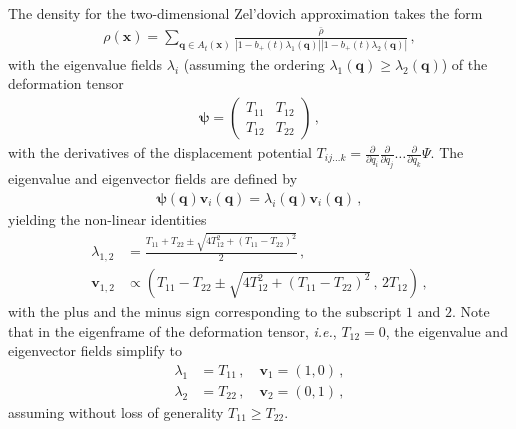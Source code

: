 \documentclass[a4paper, 11pt]{article}
\begin{document}
The density for the two-dimensional Zel'dovich approximation takes the form
\begin{align}
\rho(\bm{x}) = \sum_{\bm{q} \in A_t(\bm{x})}\frac{\bar{\rho}}{|1-b_+(t)\lambda_1(\bm{q})||1-b_+(t)\lambda_2(\bm{q})|}\,,
\end{align}
with the eigenvalue fields $\lambda_i$ (assuming the ordering $\lambda_1(\bm{q}) \geq \lambda_2(\bm{q})$) of the deformation tensor
\begin{align}
\bm{\psi} =
\begin{pmatrix}
T_{11} & T_{12}\\
T_{12} & T_{22}
\end{pmatrix}\,,
\end{align}
with the derivatives of the displacement potential $T_{i j \dots k} = \frac{\partial}{\partial q_i}\frac{\partial}{\partial q_j}\dots \frac{\partial}{\partial q_k} \Psi$. The eigenvalue and eigenvector fields are defined by
\begin{align}
\bm{\psi}(\bm{q}) \bm{v}_i(\bm{q}) =\lambda_i(\bm{q}) \bm{v}_i(\bm{q})\,,
\end{align}
yielding the non-linear identities
\begin{align}
\lambda_{1,2} &= \frac{T_{11}+T_{22} \pm \sqrt{4T_{12}^2 + (T_{11}-T_{22})^2}}{2}\,,\\
\bm{v}_{1,2} &\propto \left(T_{11}-T_{22} \pm \sqrt{4T_{12}^2 + (T_{11}-T_{22})^2}\,,\,2 T_{12}\right)\,,
\end{align}
with the plus and the minus sign corresponding to the subscript $1$ and $2$. Note that in the eigenframe of the deformation tensor, \textit{i.e.}, $T_{12}=0$, the eigenvalue and eigenvector fields simplify to
\begin{align}
\lambda_1&=T_{11}\,, \quad \bm{v}_1=(1,0)\,,\\
\lambda_{2}&=T_{22}\,, \quad \bm{v}_2=(0,1)\,,
\end{align}
assuming without loss of generality $T_{11}\geq T_{22}$.
\end{document}

